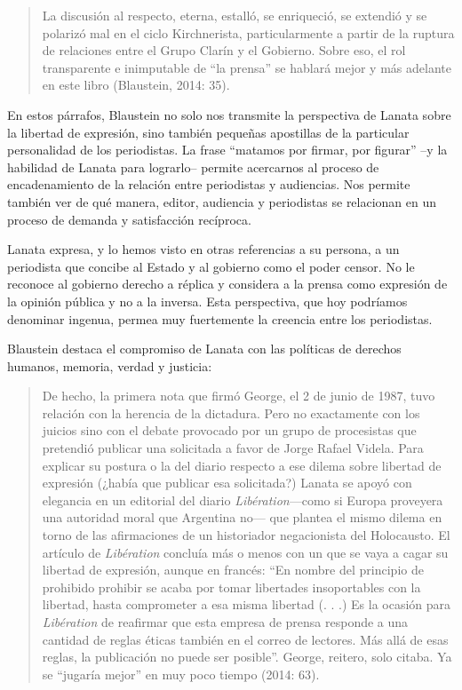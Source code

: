 {\begin{quote}
La discusión al respecto, eterna, estalló, se enriqueció, se extendió y se polarizó mal en el ciclo Kirchnerista, particularmente a partir de la ruptura de relaciones entre el Grupo Clarín y el Gobierno. Sobre eso, el rol transparente e inimputable de ``la prensa'' se hablará mejor y más adelante en este libro (Blaustein, 2014: 35).
\end{quote}

En estos párrafos, Blaustein no solo nos transmite la perspectiva de Lanata sobre la libertad de expresión, sino también pequeñas apostillas de la particular personalidad de los periodistas. La frase ``matamos por firmar, por figurar'' --y la habilidad de Lanata para lograrlo-- permite acercarnos al proceso de encadenamiento de la relación entre periodistas y audiencias. Nos permite también ver de qué manera, editor, audiencia y periodistas se relacionan en un proceso de demanda y satisfacción recíproca.

Lanata expresa, y lo hemos visto en otras referencias a su persona, a un periodista que concibe al Estado y al gobierno como el poder censor. No le reconoce al gobierno derecho a réplica y considera a la prensa como expresión de la opinión pública y no a la inversa. Esta perspectiva, que hoy podríamos denominar ingenua, permea muy fuertemente la creencia entre los periodistas.

Blaustein destaca el compromiso de Lanata con las políticas de derechos humanos, memoria, verdad y justicia:

\begin{quote}
De hecho, la primera nota que firmó George, el 2 de junio de 1987, tuvo relación con la herencia de la dictadura. Pero no exactamente con los juicios sino con el debate provocado por un grupo de procesistas que pretendió publicar una solicitada a favor de Jorge Rafael Videla. Para explicar su postura o la del diario respecto a ese dilema sobre libertad de expresión (¿había que publicar esa solicitada?) Lanata se apoyó con elegancia en un editorial del diario \emph{Libération}---como si Europa proveyera una autoridad moral que Argentina no--- que plantea el mismo dilema en torno de las afirmaciones de un historiador negacionista del Holocausto. El artículo de \emph{Libération} concluía más o menos con un que se vaya a cagar su libertad de expresión, aunque en francés: ``En nombre del principio de prohibido prohibir se acaba por tomar libertades insoportables con la libertad, hasta comprometer a esa misma libertad (. . .) Es la ocasión para \emph{Libération} de reafirmar que esta empresa de prensa responde a una cantidad de reglas éticas también en el correo de lectores. Más allá de esas reglas, la publicación no puede ser posible''. George, reitero, solo citaba. Ya se ``jugaría mejor'' en muy poco tiempo (2014: 63).
\end{quote}

}
